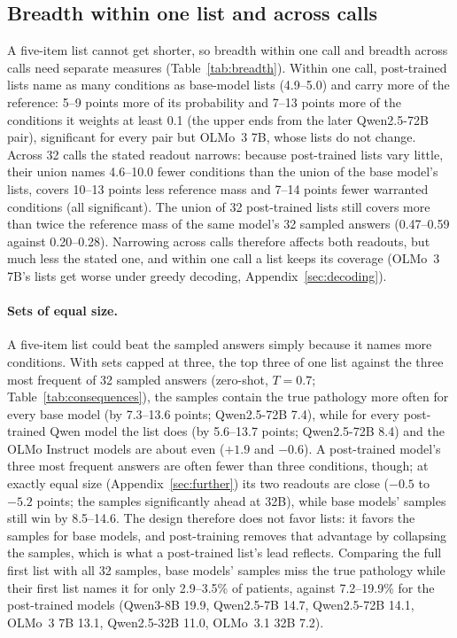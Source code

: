 \documentclass[wcp]{jmlr}
\begin{document}
\subsection{Breadth within one list and across calls}\label{sec:breadth}
A five-item list cannot get shorter, so breadth within one call and breadth across calls need separate measures (Table~\ref{tab:breadth}). Within one call, post-trained lists name as many conditions as base-model lists (4.9--5.0) and carry more of the reference: 5--9 points more of its probability and 7--13 points more of the conditions it weights at least 0.1 (the upper ends from the later Qwen2.5-72B pair), significant for every pair but OLMo~3 7B, whose lists do not change. Across 32 calls the stated readout narrows: because post-trained lists vary little, their union names 4.6--10.0 fewer conditions than the union of the base model's lists, covers 10--13 points less reference mass and 7--14 points fewer warranted conditions (all significant). The union of 32 post-trained lists still covers more than twice the reference mass of the same model's 32 sampled answers (0.47--0.59 against 0.20--0.28). Narrowing across calls therefore affects both readouts, but much less the stated one, and within one call a list keeps its coverage (OLMo~3 7B's lists get worse under greedy decoding, Appendix~\ref{sec:decoding}).

\paragraph{Sets of equal size.} A five-item list could beat the sampled answers simply because it names more conditions. With sets capped at three, the top three of one list against the three most frequent of 32 sampled answers (zero-shot, $T{=}0.7$; Table~\ref{tab:consequences}), the samples contain the true pathology more often for every base model (by 7.3--13.6 points; Qwen2.5-72B 7.4), while for every post-trained Qwen model the list does (by 5.6--13.7 points; Qwen2.5-72B 8.4) and the OLMo Instruct models are about even ($+1.9$ and $-0.6$). A post-trained model's three most frequent answers are often fewer than three conditions, though; at exactly equal size (Appendix~\ref{sec:further}) its two readouts are close ($-0.5$ to $-5.2$ points; the samples significantly ahead at 32B), while base models' samples still win by 8.5--14.6. The design therefore does not favor lists: it favors the samples for base models, and post-training removes that advantage by collapsing the samples, which is what a post-trained list's lead reflects. Comparing the full first list with all 32 samples, base models' samples miss the true pathology while their first list names it for only 2.9--3.5\% of patients, against 7.2--19.9\% for the post-trained models (Qwen3-8B 19.9, Qwen2.5-7B 14.7, Qwen2.5-72B 14.1, OLMo~3 7B 13.1, Qwen2.5-32B 11.0, OLMo~3.1 32B 7.2).
\end{document}
